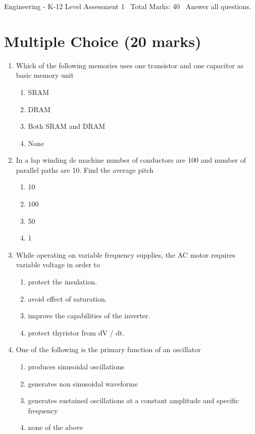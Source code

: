 \documentclass[12pt]{article}
\begin{document}
\begin{center}
Engineering - K-12 Level Assessment 1 \
Total Marks: 40 \
Answer all questions.
\end{center}

\section*{Multiple Choice (20 marks)}
\begin{enumerate}[label=\arabic*.]
\item Which of the following memories uses one transistor and one capacitor as basic memory unit
\begin{enumerate}[label=(\alph*)]
    \item SRAM
    \item DRAM
    \item Both SRAM and DRAM
    \item None
\end{enumerate}
\item In a lap winding dc machine number of conductors are 100 and number of parallel paths are 10. Find the average pitch
\begin{enumerate}[label=(\alph*)]
    \item 10
    \item 100
    \item 50
    \item 1
\end{enumerate}
\item While operating on variable frequency supplies, the AC motor requires variable voltage in order to
\begin{enumerate}[label=(\alph*)]
    \item protect the insulation.
    \item avoid effect of saturation.
    \item improve the capabilities of the inverter.
    \item protect thyristor from dV / dt.
\end{enumerate}
\item One of the following is the primary function of an oscillator
\begin{enumerate}[label=(\alph*)]
    \item produces sinusoidal oscillations
    \item generates non sinusoidal waveforms
    \item generates sustained oscillations at a constant amplitude and specific frequency
    \item none of the above

\end{enumerate}
\end{enumerate}
\end{document}
